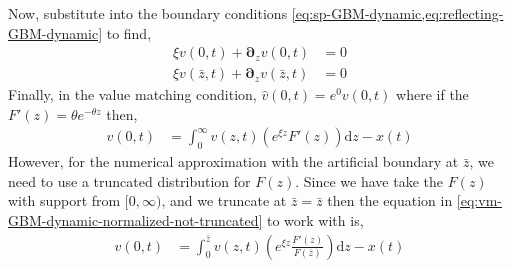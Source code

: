 \documentclass[11pt]{article}
\newcommand{\D}[1][]{\ensuremath{\boldsymbol{\partial}_{#1}}}
\newcommand{\diff}{\ensuremath{\mathrm{d}}}
\begin{document}
Now, substitute into the boundary conditions \cref{eq:sp-GBM-dynamic,eq:reflecting-GBM-dynamic} to find,
\begin{align}
	\xi v(0,t) + \D[z]v(0,t ) &= 0\label{eq:new-BC1}\\
	\xi v(\bar{z},t) + \D[z]v(\bar{z},t) &= 0\label{eq:new-BC2}
\end{align}
Finally, in the value matching condition, $\hat{v}(0,t) = e^{0} v(0,t)$ where if the $F'(z) = \theta e^{-\theta z}$ then,
\begin{align}
	 v(0,t) &= \int_{0}^{\infty}  v(z,t) \left(e^{\xi z} F'(z)\right) \diff z - x(t)\label{eq:vm-GBM-dynamic-normalized-not-truncated}
\end{align}
However, for the numerical approximation with the artificial boundary at $\bar{z}$, we need to use a truncated distribution for $F(z)$.  Since we have take the $F(z)$ with support from $[0,\infty)$, and we truncate at $\bar{z} = \bar{z}$ then the equation in \cref{eq:vm-GBM-dynamic-normalized-not-truncated} to work with is,
\begin{align}
	 v(0,t) &= \int_{0}^{\bar{z}}  v(z,t) \left(e^{\xi z} \frac{F'(z)}{F(\bar{z})}\right) \diff z - x(t)\label{eq:vm-GBM-dynamic-normalized}
\end{align}
\end{document}
